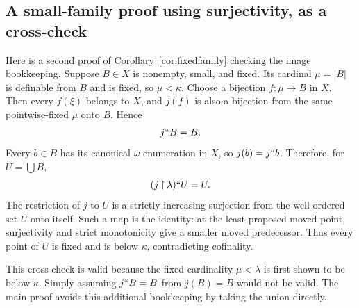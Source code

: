 \documentclass[11pt,letterpaper]{article}
\theoremstyle{definition}
\numberwithin{equation}{section}
\newcommand{\restr}{\mathbin{\upharpoonright}}
\begin{document}
\subsection{A small-family proof using surjectivity, as a cross-check}

Here is a second proof of Corollary~\ref{cor:fixedfamily} checking the image bookkeeping. Suppose $B\in X$ is nonempty, small, and fixed. Its cardinal $\mu=|B|$ is definable from $B$ and is fixed, so $\mu<\kappa$. Choose a bijection $f:\mu\to B$ in $X$. Then every $f(\xi)$ belongs to $X$, and $j(f)$ is also a bijection from the same pointwise-fixed $\mu$ onto $B$. Hence
\[
 j``B=B.
\]
Every $b\in B$ has its canonical $\omega$-enumeration in $X$, so $j(b)=j``b$. Therefore, for $U=\bigcup B$,
\[
 (j\restr\lambda)``U=U.
\]
The restriction of $j$ to $U$ is a strictly increasing surjection from the well-ordered set $U$ onto itself. Such a map is the identity: at the least proposed moved point, surjectivity and strict monotonicity give a smaller moved predecessor. Thus every point of $U$ is fixed and is below $\kappa$, contradicting cofinality.

This cross-check is valid because the fixed cardinality $\mu<\lambda$ is first shown to be below $\kappa$. Simply assuming $j``B=B$ from $j(B)=B$ would not be valid. The main proof avoids this additional bookkeeping by taking the union directly.
\end{document}
